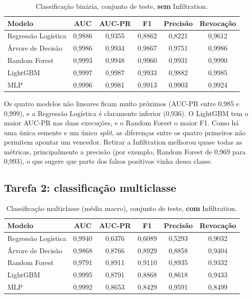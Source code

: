 \begin{table}[ht]
\centering
\caption{Classificação binária, conjunto de teste, \textbf{sem} Infiltration.}
\begin{tabular}{lccccc}
\toprule
Modelo & AUC & AUC-PR & F1 & Precisão & Revocação \\
\midrule
Regressão Logística & 0,9886 & 0,9355 & 0,8862 & 0,8221 & 0,9612 \\
Árvore de Decisão   & 0,9986 & 0,9934 & 0,9867 & 0,9751 & 0,9986 \\
Random Forest       & 0,9993 & 0,9948 & 0,9960 & 0,9931 & 0,9990 \\
LightGBM            & 0,9997 & 0,9987 & 0,9933 & 0,9882 & 0,9985 \\
MLP                 & 0,9996 & 0,9981 & 0,9913 & 0,9903 & 0,9924 \\
\bottomrule
\end{tabular}
\end{table}

Os quatro modelos não lineares ficam muito próximos (AUC-PR entre 0,985 e 0,999), e a Regressão Logística é claramente inferior (0,936). O LightGBM tem o maior AUC-PR nas duas execuções, e o Random Forest o maior F1. Como há uma única semente e um único \textit{split}, as diferenças entre os quatro primeiros não permitem apontar um vencedor. Retirar a Infiltration melhorou quase todas as métricas, principalmente a precisão (por exemplo, Random Forest de 0,969 para 0,993), o que sugere que parte dos falsos positivos vinha dessa classe.

\subsection{Tarefa 2: classificação multiclasse}

\begin{table}[ht]
\centering
\caption{Classificação multiclasse (média macro), conjunto de teste, \textbf{com} Infiltration.}
\begin{tabular}{lccccc}
\toprule
Modelo & AUC & AUC-PR & F1 & Precisão & Revocação \\
\midrule
Regressão Logística & 0,9940 & 0,6376 & 0,6089 & 0,5293 & 0,9032 \\
Árvore de Decisão   & 0,9868 & 0,8766 & 0,8929 & 0,8858 & 0,9404 \\
Random Forest       & 0,9791 & 0,8911 & 0,9110 & 0,8935 & 0,9332 \\
LightGBM            & 0,9995 & 0,8791 & 0,8868 & 0,8618 & 0,9433 \\
MLP                 & 0,9992 & 0,8653 & 0,8429 & 0,9591 & 0,8499 \\
\bottomrule
\end{tabular}
\end{table}

